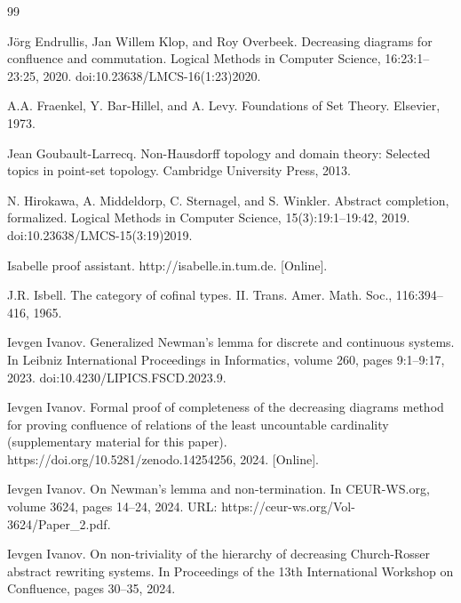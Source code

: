 \documentclass[10pt,a4paper]{amsart}
\begin{document}
\begin{thebibliography}{99}
\par\noindent  [10]  Jörg Endrullis, Jan Willem Klop, and Roy Overbeek.  Decreasing diagrams for confluence and commutation.  Logical Methods in Computer Science, 16:23:1–23:25, 2020.  doi:10.23638/LMCS-16(1:23)2020.  
 
\par\noindent  [11]  A.A. Fraenkel, Y. Bar-Hillel, and A. Levy.  Foundations of Set Theory.  Elsevier, 1973.  
 
\par\noindent  [12]  Jean Goubault-Larrecq.  Non-Hausdorff topology and domain theory: Selected topics in point-set topology.  Cambridge University Press, 2013.  
 
\par\noindent  [13]  N. Hirokawa, A. Middeldorp, C. Sternagel, and S. Winkler.  Abstract completion, formalized.  Logical Methods in Computer Science, 15(3):19:1–19:42, 2019.  doi:10.23638/LMCS-15(3:19)2019.  
 
\par\noindent  [14]  Isabelle proof assistant.  http://isabelle.in.tum.de.  [Online].  
 
\par\noindent  [15]  J.R. Isbell.  The category of cofinal types. II.  Trans. Amer. Math. Soc., 116:394–416, 1965.  
 
\par\noindent  [16]  Ievgen Ivanov.  Generalized Newman’s lemma for discrete and continuous systems.  In Leibniz International Proceedings in Informatics, volume 260, pages 9:1–9:17, 2023.  doi:10.4230/LIPICS.FSCD.2023.9.  
 
\par\noindent  [17]  Ievgen Ivanov.  Formal proof of completeness of the decreasing diagrams method for proving confluence of relations of the least uncountable cardinality (supplementary material for this paper).  https://doi.org/10.5281/zenodo.14254256, 2024.  [Online].  
 
\par\noindent  [18]  Ievgen Ivanov.  On Newman’s lemma and non-termination.  In CEUR-WS.org, volume 3624, pages 14–24, 2024.  URL: https://ceur-ws.org/Vol-3624/Paper\_2.pdf.  
 
\par\noindent  [19]  Ievgen Ivanov.  On non-triviality of the hierarchy of decreasing Church-Rosser abstract rewriting systems.  In Proceedings of the 13th International Workshop on Confluence, pages 30–35, 2024.  
 

\end{thebibliography}
\end{document}
